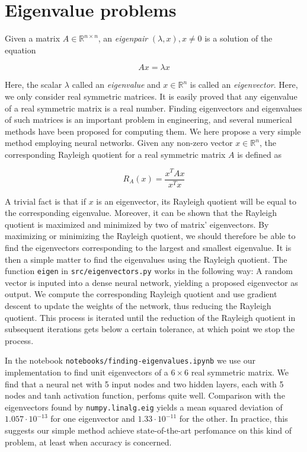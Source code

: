 \documentclass{article}
\begin{document}
\section{Eigenvalue problems}
Given a matrix $A \in \mathbb{R}^{n \times n}$, an \textit{eigenpair} $(\lambda, x), x \neq 0$ is a solution of the equation

\begin{equation}
    Ax = \lambda x
\end{equation}

Here, the scalar $\lambda$ called an \textit{eigenvalue} and $x \in \mathbb{R}^n$ is called an \textit{eigenvector}. Here, we only consider real symmetric matrices. It is easily proved that any eigenvalue of a real symmetric matrix is a real number. Finding eigenvectors and eigenvalues of such matrices is an important problem in engineering, and several numerical methods have been proposed for computing them. We here propose a very simple method employing neural networks. Given any non-zero vector $x \in \mathbb{R}^n$, the corresponding Rayleigh quotient for a real symmetric matrix $A$ is defined as

\begin{equation}
    R_A(x) = \frac{x^T A x}{x^T x}
\end{equation}

A trivial fact is that if $x$ is an eigenvector, its Rayleigh quotient will be equal to the corresponding eigenvalue. Moreover, it can be shown that the Rayleigh quotient is maximized and minimized by two of matrix' eigenvectors. By maximizing or minimizing the Rayleigh quotient, we should therefore be able to find the eigenvectors corresponding to the largest and smallest eigenvalue. It is then a simple matter to find the eigenvalues using the Rayleigh quotient. The function \texttt{eigen} in \texttt{src/eigenvectors.py} works in the following way: A random vector is inputed into a dense neural network, yielding a proposed eigenvector as output. We compute the corresponding Rayleigh quotient and use gradient descent to update the weights of the network, thus reducing the Rayleigh quotient. This process is iterated until the reduction of the Rayleigh quotient in subsequent iterations gets below a certain tolerance, at which point we stop the process.

In the notebook \texttt{notebooks/finding-eigenvalues.ipynb} we use our implementation to find unit eigenvectors of a $6 \times 6$ real symmetric matrix. We find that a neural net with 5 input nodes and two hidden layers, each with 5 nodes and tanh activation function, perfoms quite well. Comparison with the eigenvectors found by \texttt{numpy.linalg.eig} yields a mean squared deviation of $1.057 \cdot 10^{-13}$ for one eigenvector and $1.33 \cdot10^{-11}$ for the other. In practice, this suggests our simple method achieve state-of-the-art perfomance on this kind of problem, at least when accuracy is concerned.
\end{document}
